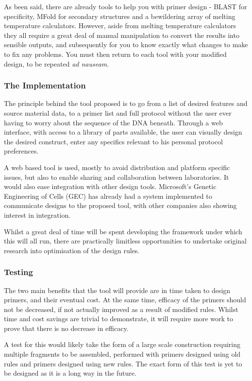 \documentclass[../main.tex]{subfiles}
\begin{document}
As been said, there are already tools to help you with primer design - BLAST for specificity, MFold for secondary structures and a bewildering array of melting temperature calculators. However, aside from melting temperature calculators they all require a great deal of manual manipulation to convert the results into sensible outputs, and subsequently for you to know exactly what changes to make to fix any problems. You must then return to each tool with your modified design, to be repeated \emph{ad nauseam}.

\subsubsection{The Implementation}

The principle behind the tool proposed is to go from a list of desired features and source material data, to a primer list and full protocol without the user ever having to worry about the sequence of the DNA beneath. Through a web interface, with access to a library of parts available, the user can visually design the desired construct, enter any specifics relevant to his personal protocol preferences.

A web based tool is used, mostly to avoid distribution and platform specific issues, but also to enable sharing and collaboration between laboratories. It would also ease integration with other design tools. Microsoft's Genetic Engineering of Cells (GEC) has already had a system implemented to communicate designs to the proposed tool, with other companies also showing interest in integration.

Whilst a great deal of time will be spent developing the framework under which this will all run, there are practically limitless opportunities to undertake original research into optimisation of the design rules.

\subsubsection{Testing}

The two main benefits that the tool will provide are in time taken to design primers, and their eventual cost. At the same time, efficacy of the primers should not be decreased, if not actually improved as a result of modified rules. Whilst time and cost savings are trivial to demonstrate, it will require more work to prove that there is no decrease in efficacy.

A test for this would likely take the form of a large scale construction requiring multiple fragments to be assembled, performed with primers designed using old rules and primers designed using new rules. The exact form of this test is yet to be designed as it is a long way in the future.
\end{document}
